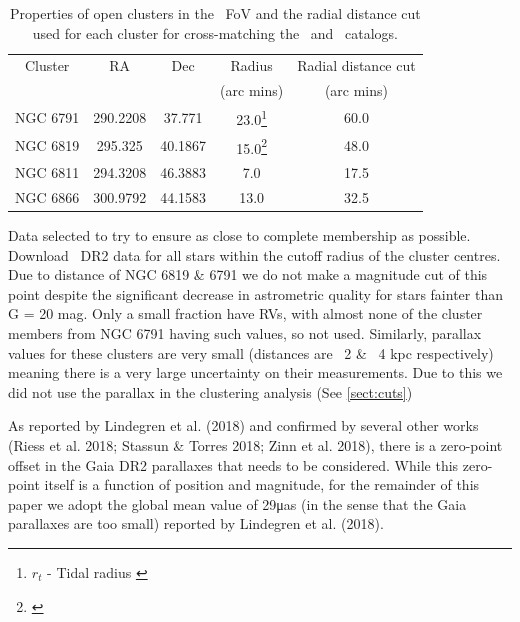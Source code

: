 \vspace{3pt}

\begin{table}[h]
    \centering
    \setlength\tabcolsep{10pt}
    \begin{tabular}{ccccc}
        \hline
        Cluster     & RA        & Dec       & Radius    & Radial distance cut \\
                    &           &           & (arc mins)& (arc mins) \\
        \hline
        \hline
        NGC 6791    & 290.2208  & 37.771    & 23.0\footnote[2]{$r_t$ - Tidal radius \citep{platais_new_2011}} & 60.0\\
        NGC 6819    & 295.325   & 40.1867   & 15.0\footnote[2]{\citet{yang_wiyn_2013}} & 48.0\\
        NGC 6811    & 294.3208  & 46.3883   & 7.0               & 17.5\\
        NGC 6866    & 300.9792  & 44.1583   & 13.0              & 32.5\\
        \hline
    \end{tabular}
    \caption{Properties of open clusters in the \Kepler~FoV and the radial distance cut used for each cluster for cross-matching the \Gaia~and \Kepler~catalogs.}
    \label{tab:cluster_selection}
\end{table}

Data selected to try to ensure as close to complete membership as possible. Download \Gaia~DR2 data for all stars within the cutoff radius of the cluster centres. Due to distance of NGC 6819 \& 6791 we do not make a magnitude cut of this point despite the significant decrease in astrometric quality for stars fainter than G = 20 mag. Only a small fraction have RVs, with almost none of the cluster members from NGC 6791 having such values, so not used. Similarly, parallax values for these clusters are very small (distances are ~2 \& ~4 kpc respectively) meaning there is a very large uncertainty on their measurements. Due to this we did not use the parallax in the clustering analysis (See \cref{sect:cuts})

As reported by Lindegren et al. (2018) and confirmed
by several other works (Riess et al. 2018; Stassun &
Torres 2018; Zinn et al. 2018), there is a zero-point offset
in the Gaia DR2 parallaxes that needs to be considered.
While this zero-point itself is a function of position and
magnitude, for the remainder of this paper we adopt the
global mean value of 29μas (in the sense that the Gaia
parallaxes are too small) reported by Lindegren et al.
(2018).

